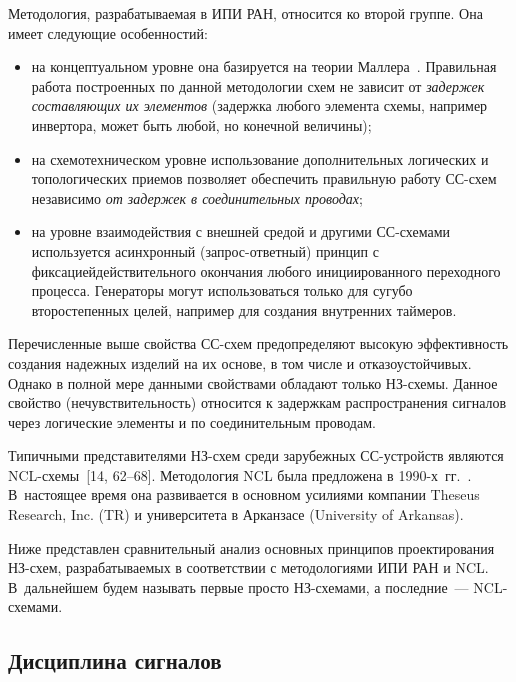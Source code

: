 \begin{multicols}{2}
       Методология, разрабатываемая в ИПИ РАН, относится ко второй группе. Она имеет 
следующие особенностий:
       \begin{itemize}
\item на концептуальном уровне она базируется на теории Маллера~\cite{3-sok, 4-sok}. 
Правильная работа построенных по данной методологии схем не зависит от \textit{задержек 
составляющих их элементов} (задержка любого элемента схемы, например инвертора, 
может быть любой, но конечной величины);
\item на схемотехническом уровне использование дополнительных логических и 
топологических приемов позволяет обеспечить правильную работу СС-схем независимо 
\textit{от задержек в соединительных проводах};
\item на уровне взаимодействия с внешней средой и другими СС-схе\-ма\-ми используется 
асинхронный (запрос-от\-вет\-ный) принцип с фиксацией\linebreak действительного окончания любого 
ини\-ци\-ированного переходного процесса. Генераторы могут использоваться только для 
сугубо второстепенных целей, например для создания внут\-рен\-них таймеров.
\end{itemize}

       Перечисленные выше свойства СС-схем пред\-опре\-деляют высокую эффективность 
создания надежных изделий на их основе, в том числе и отказоустойчивых. Однако в полной 
мере данными свойствами обладают только НЗ-схе\-мы. 
Данное свойство (нечувствительность) относится к задержкам распространения сигналов 
через логические элементы и по соединительным проводам.
       
       Типичными представителями НЗ-схем среди зарубежных СС-устройств являются 
NCL-схе\-мы~[14, 62--68]. Методология NCL была предложена в 
       \mbox{1990-х~гг}.~\cite{13-sok}. В~настоящее время она развивается в основном усилиями 
компании Theseus Research, Inc. (TR) и университета в Арканзасе (University of Arkansas).
       
       Ниже представлен сравнительный анализ основных принципов проектирования 
       НЗ-схем, разрабатываемых в соответствии с методологиями ИПИ РАН и NCL. 
В~дальнейшем будем называть первые просто НЗ-схе\-ма\-ми, а последние~--- 
       NCL-схе\-мами.
       
       \subsection{Дисциплина сигналов}
       

\end{multicols}
